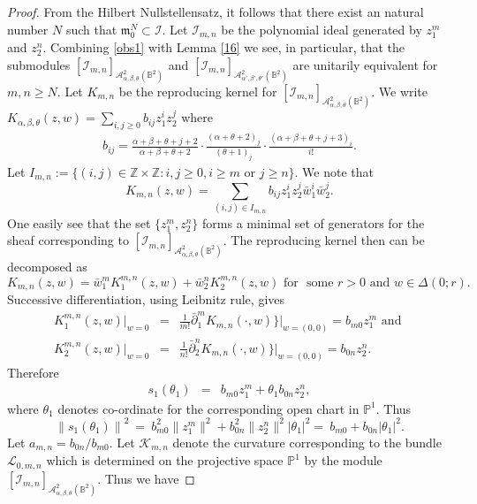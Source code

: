 \documentclass[11pt]{amsart}
\theoremstyle{definition}
\numberwithin{equation}{section}
\begin{document}
\begin{proof} From the Hilbert Nullstellensatz, it follows that there exist an natural number $N$ such that $\mathfrak m_0^N\subset \mathcal I$. Let $\mathcal I_{m,n}$ be the polynomial ideal generated by $z_1^m$ and $z_2^n$. Combining \eqref{obs1} with Lemma \ref{16} we see, in particular, that the submodules $[\mathcal I_{m,n}]_{{\mathcal A}^2_{\alpha,\beta,\theta}(\mathbb B^2)}$  and $[\mathcal I_{m,n}]_ {{\mathcal A}^2_{\alpha',\beta',\theta'}(\mathbb B^2)}$  are unitarily equivalent for $m,n\geq N$. Let $K_{m,n}$  be the reproducing kernel for $[\mathcal I_{m,n}]_{{\mathcal A}^2_{\alpha,\beta,\theta}(\mathbb B^2)}$.  We write $K_{\alpha,\beta,\theta}(z,w) = \sum_{i,j\geq0}b_{ij}z_1^iz_2^j$ where
\begin{eqnarray}\label{coeff}
b_{ij}= \frac{\alpha+\beta+\theta+j+2}{\alpha+\beta+\theta+2}\cdot\frac{(\alpha+\theta+2)_j}{(\theta+1)_j}\cdot\frac{(\alpha+\beta+\theta+j+3)_i}{i!}.
\end{eqnarray}
Let $I_{m,n}:=\{(i,j)\in\mathbb Z\times\mathbb Z: i,j\geq 0, i\geq m\mbox{~or~}j\geq n\}$. We note that
$$K_{m,n}(z,w)= {\sum}_{(i,j)\in I_{m,n}}b_{ij}z_1^iz_2^j\bar w_1^i\bar w_2^j.$$
One easily see that the set $\{z_1^m, z_2^n\}$ forms a minimal set of generators for the sheaf corresponding to $[\mathcal I_{m,n}]_{{\mathcal A}^2_{\alpha,\beta,\theta}(\mathbb B^2)}$. The reproducing kernel then can be decomposed as 
$$
K_{m,n}(z,w) = \bar w_1^mK_1^{m,n}(z,w)+\bar w_2^nK_2^{m,n}(z,w) \mbox{~for~ some~} r>0\mbox{~and~} w\in\Delta(0;r).
$$ 
Successive differentiation, using Leibnitz rule, gives
\begin{eqnarray*}
K_1^{m,n}(z,w)|_{w=0} &=& \frac{1}{m!}\bar\partial_1^mK_{m,n}(\cdot,w)\}|_{w=(0,0)} = b_{m0}z_1^m\mbox{~and~}\\ K_2^{m,n}(z,w)|_{w=0} &=& \frac{1}{n!}\bar\partial_2^nK_{m,n}(\cdot,w)\}|_{w=(0,0)} = b_{0n}z_2^n.
\end{eqnarray*}
Therefore
\begin{eqnarray*}
s_1(\theta_1) &=& b_{m0}z_1^m+\theta_1 b_{0n}z_2^n,
\end{eqnarray*}
where $\theta_1$ denotes co-ordinate for the corresponding open chart in $\mathbb P^1$. Thus
$$
{\parallel s_1(\theta_1)\parallel}^2~=~b_{m0}^2 \parallel z_1^m\parallel^2+b_{0n}^2 \parallel z_2^n\parallel^2 |\theta_1|^2 =~b_{m0}+b_{0n} |\theta_1|^{2}.
$$ 
Let
$a_{m,n}=b_{0n}/b_{m0}$. Let $\mathcal K_{m,n}$ denote the curvature corresponding
to the bundle $\mathcal L_{0,m,n}$ which is determined on the projective space $\mathbb P^1$ by the module $[\mathcal I_{m,n}]_{{\mathcal A}^2_{\alpha,\beta,\theta}(\mathbb B^2)}$. Thus we have

\end{proof}
\end{document}
